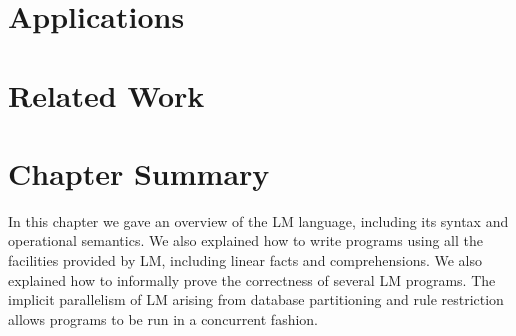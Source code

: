 \section{Applications}


\section{Related Work}\label{section:language:related}

\section{Chapter Summary}

In this chapter we gave an overview of the LM language, including its syntax and
operational semantics.  We also explained how to write programs using all the
facilities provided by LM, including linear facts and comprehensions. We also
explained how to informally prove the correctness of several LM programs.  The implicit
parallelism of LM arising from database partitioning and rule restriction allows
programs to be run in a concurrent fashion.
